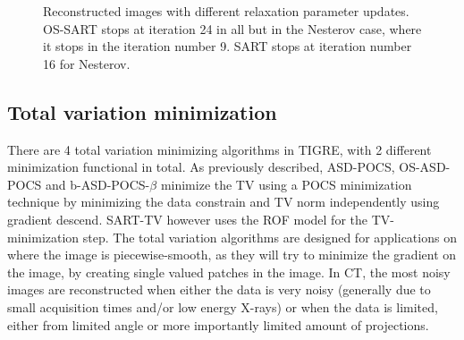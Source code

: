 \begin{figure}
\centering
{}
\caption[Reconstructed images with different relaxation parameter updates]{\label{fig:SARTlambdaplot}Reconstructed images with different relaxation parameter updates. OS-SART stops at iteration 24 in all but in the Nesterov case, where it stops in the iteration number 9. SART stops at iteration number 16 for Nesterov.}
\end{figure}



\subsection{Total variation minimization}
There are 4 total variation minimizing algorithms in TIGRE, with 2 different minimization functional in total. As previously described, ASD-POCS, OS-ASD-POCS and b-ASD-POCS-$\beta$ minimize the TV using a POCS minimization technique by minimizing the data constrain and TV norm independently using gradient descend. SART-TV however uses the ROF model for the TV-minimization step. The total variation algorithms are designed for applications on where the image is piecewise-smooth, as they will try to minimize the gradient on the image, by creating single valued patches in the image. In CT, the most noisy images are reconstructed when either the data is very noisy (generally due to small acquisition times and/or low energy X-rays) or when the data is limited, either from limited angle or more importantly limited amount of projections. 


